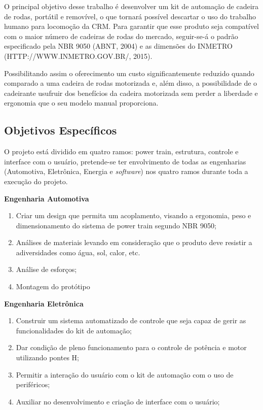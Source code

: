 O principal objetivo desse trabalho é desenvolver um kit de automação de cadeira de rodas, portátil e removível, o que tornará possível descartar o uso do trabalho humano para locomoção da CRM. Para garantir que esse produto seja compatível com o maior número de cadeiras de rodas do mercado, seguir-se-á o padrão especificado pela NBR 9050 (ABNT, 2004) e as dimensões do INMETRO (HTTP://WWW.INMETRO.GOV.BR/, 2015).

Possibilitando assim o oferecimento um custo significantemente reduzido quando comparado a uma cadeira de rodas motorizada e, além disso, a possibilidade de o cadeirante usufruir dos benefícios da cadeira motorizada sem perder a liberdade e ergonomia que o seu modelo manual proporciona.

\subsection{Objetivos Específicos}

O projeto está dividido em quatro ramos: power train, estrutura, controle e interface com o usuário, pretende-se ter envolvimento de todas as engenharias (Automotiva, Eletrônica, Energia e \textit{software}) nos quatro ramos durante toda a execução do projeto.

\textbf{Engenharia Automotiva}

  \begin{enumerate}
    \item Criar um design que permita um acoplamento, visando a ergonomia, peso e dimensionamento do sistema de power train segundo NBR 9050;
    \item Análises de materiais levando em consideração que o produto deve resistir a adiversidades como água, sol, calor, etc.
    \item Análise de esforços;
    \item Montagem do protótipo
  \end{enumerate}

\textbf{Engenharia Eletrônica}
  \begin{enumerate}
    \item Construir um sistema automatizado de controle que seja capaz de gerir as funcionalidades do kit de automação;
    \item Dar condição de pleno funcionamento para o controle de potência e motor utilizando pontes H;
    \item Permitir a interação do usuário com o kit de automação com o uso de periféricos;
    \item Auxiliar no desenvolvimento e criação de interface com o usuário;
  \end{enumerate}


